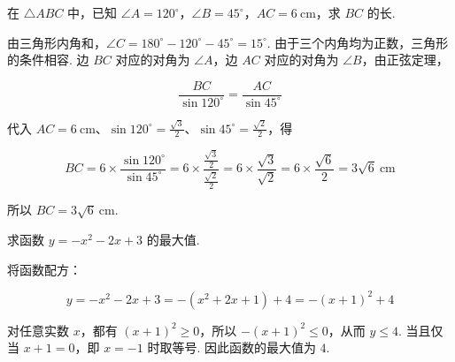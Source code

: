 \begin{problem}
在 \(\triangle ABC\) 中，已知 \(\angle A=120^\circ\)，\(\angle B=45^\circ\)，\(AC=6\mathrm{~cm}\)，求 \(BC\) 的长.

\FloatBarrier
\end{problem}

\begin{solution}
由三角形内角和，\(\angle C=180^\circ-120^\circ-45^\circ=15^\circ\). 由于三个内角均为正数，三角形的条件相容. 边 \(BC\) 对应的对角为 \(\angle A\)，边 \(AC\) 对应的对角为 \(\angle B\)，由正弦定理，

\[
\frac{BC}{\sin120^\circ}=\frac{AC}{\sin45^\circ}
\]

代入 \(AC=6\mathrm{~cm}\)、\(\sin120^\circ=\frac{\sqrt3}{2}\)、\(\sin45^\circ=\frac{\sqrt2}{2}\)，得

\[
BC=6\times\frac{\sin120^\circ}{\sin45^\circ}
=6\times\frac{\frac{\sqrt3}{2}}{\frac{\sqrt2}{2}}
=6\times\frac{\sqrt3}{\sqrt2}
=6\times\frac{\sqrt6}{2}
=3\sqrt6\mathrm{~cm}
\]

所以 \(BC=3\sqrt6\mathrm{~cm}\).
\end{solution}

\begin{problem}
求函数 \(y=-x^2-2x+3\) 的最大值.
\end{problem}

\begin{solution}
将函数配方：

\[
y=-x^2-2x+3=-\left(x^2+2x+1\right)+4=-\left(x+1\right)^2+4
\]

对任意实数 \(x\)，都有 \(\left(x+1\right)^2\geqslant0\)，所以 \(-\left(x+1\right)^2\leqslant0\)，从而 \(y\leqslant4\). 当且仅当 \(x+1=0\)，即 \(x=-1\) 时取等号. 因此函数的最大值为 \(4\).
\end{solution}
